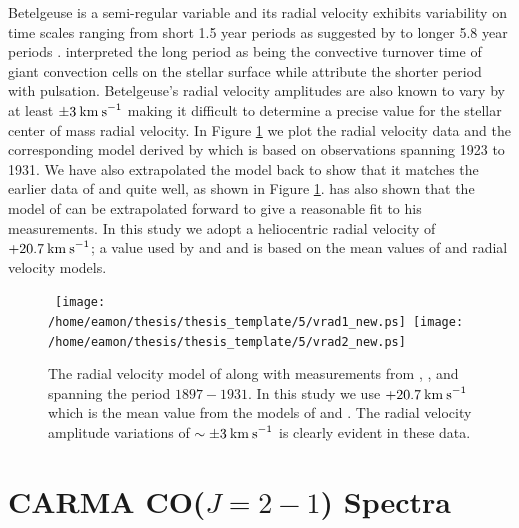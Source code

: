 Betelgeuse is a  semi-regular variable and its radial velocity exhibits variability on time scales ranging from short 1.5 year periods as suggested by \cite{stebbins_1931} to longer 5.8 year periods \citep{spencer_jones_1928,smith_1989}. 
\cite{stothers_1971} interpreted the long period as being the convective turnover time of giant convection cells on the stellar surface while \cite{dupree_1990} attribute the shorter period with pulsation. Betelgeuse's radial velocity amplitudes are also known to vary by at least $\pm 3\>{\rm km\>s}^{-1}$ \citep{smith_1989} making it difficult to determine a precise value for the stellar center of mass radial velocity. In Figure \ref{fig:5.3} we plot the radial velocity data and the corresponding model derived by \cite{sanford_1933} which is based on observations spanning 1923 to 1931. We have also extrapolated the model back to show that it matches the earlier data of \cite{bottlinger_1911} and \cite{spencer_jones_1928} quite well, as shown in Figure \ref{fig:5.3}. \cite{goldberg_1984} has also shown that the model of \cite{sanford_1933} can be extrapolated forward to give a reasonable fit to his measurements. In this study we adopt a heliocentric radial velocity of $+20.7\>{\rm km\>s}^{-1}$;  a value used by \cite{weymann_1962} and \citet{harper_2008} and is based on the mean values of \cite{spencer_jones_1928} and \cite{sanford_1933} radial velocity models. 

\begin{figure}[!ht]
\centering 
\mbox{
          \texttt{[image: /home/eamon/thesis/thesis\_template/5/vrad1\_new.ps]}
          \texttt{[image: /home/eamon/thesis/thesis\_template/5/vrad2\_new.ps]}
          }
\caption[Radial velocity data and model for $\alpha$ Ori]{The radial velocity model of \cite{sanford_1933} along with measurements from \cite{bottlinger_1911}, \cite{spencer_jones_1928}, and \cite{sanford_1933} spanning the period $1897 - 1931$. In this study we use $+20.7\>{\rm km\>s}^{-1}$ which is the mean value from the models of \cite{spencer_jones_1928} and \cite{sanford_1933}. The radial velocity amplitude variations of $\sim \pm 3\>{\rm km\>s}^{-1}$ is clearly evident in these data.}
\label{fig:5.3}
\end{figure}

\section{CARMA CO($J=2-1$) Spectra}
\label{sec:5.3}


